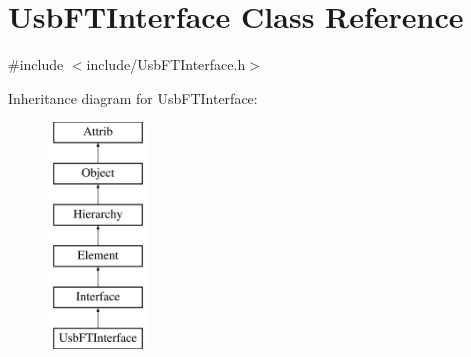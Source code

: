 \hypertarget{classUsbFTInterface}{}\section{Usb\+F\+T\+Interface Class Reference}
\label{classUsbFTInterface}


{\ttfamily \#include $<$include/\+Usb\+F\+T\+Interface.\+h$>$}

Inheritance diagram for Usb\+F\+T\+Interface\+:\begin{figure}[H]
\begin{center}
\leavevmode
\includegraphics[height=6.000000cm]{classUsbFTInterface}
\end{center}
\end{figure}
